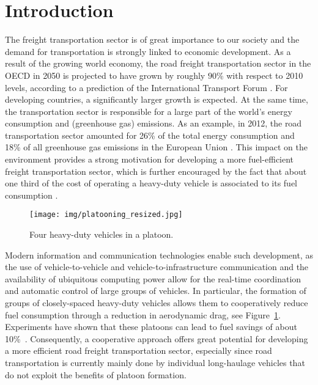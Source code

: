 \documentclass[journal]{IEEEtran}
\begin{document}
\section{Introduction}\label{sec_introduction}
The freight transportation sector is of great importance to our society and the demand for transportation is strongly linked to economic development. As a result of the growing world economy, the road freight transportation sector in the OECD in 2050 is projected to have grown by roughly $90$\% with respect to 2010 levels, according to a prediction of the International Transport Forum \cite{itf_transportoutlook_2015}. For developing countries, a significantly larger growth is expected. At the same time, the transportation sector is responsible for a large part of the world's energy consumption and (greenhouse gas) emissions. As an example, in 2012, the road transportation sector amounted for 26\% of the total energy consumption and 18\% of all greenhouse gas emissions in the European Union \cite{eu_pocketbook_2014}. This impact on the environment provides a strong motivation for developing a more fuel-efficient freight transportation sector, which is further encouraged by the fact that about one third of the cost of operating a heavy-duty vehicle is associated to its fuel consumption \cite{scania_annualreport_2014}.

\begin{figure}
\begin{center}
  \texttt{[image: img/platooning\_resized.jpg]}
  \vskip-1mm\caption{Four heavy-duty vehicles in a platoon.}
  \label{fig_platoonphoto}
\end{center}
\end{figure}

Modern information and communication technologies enable such development, as the use of vehicle-to-vehicle and vehicle-to-infrastructure communication and the availability of ubiquitous computing power allow for the real-time coordination and automatic control of large groups of vehicles. In particular, the
formation of groups of closely-spaced heavy-duty vehicles allows them to cooperatively reduce fuel consumption through a reduction in aerodynamic drag, see Figure~\ref{fig_platoonphoto}. Experiments have shown that these platoons can lead to fuel savings of about 10\%~\cite{bonnet_2000,alam_2010}. Consequently, a cooperative approach offers great potential for developing a more efficient road freight transportation sector, especially since road transportation is currently mainly done by individual long-haulage vehicles that do not exploit the benefits of platoon formation.
\end{document}
